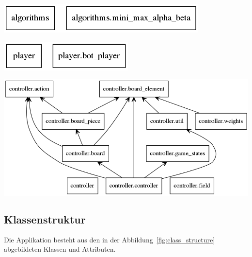 \begin{minipage}[]{1.0\textwidth}

    \centering
    \begin{minipage}[t]{0.5\textwidth}
        \includegraphics[width=\textwidth]{images/packages_algorithms.png}
    \end{minipage}
    \begin{minipage}[t]{0.3\textwidth}
        \includegraphics[width=\textwidth]{images/packages_player.png}
    \end{minipage}
    \begin{minipage}[t]{0.95\textwidth}
        \includegraphics[width=\textwidth]{images/packages_controller.png}
    \end{minipage}

\label{fig:module_structure}
\end{minipage}

\newpage

\subsection{Klassenstruktur}
\label{subsec:class_structure}
Die Applikation besteht aus den in der Abbildung~\ref{fig:class_structure} abgebildeten Klassen und Attributen.


